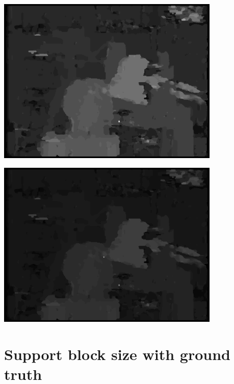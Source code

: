 \documentclass[a4paper]{scrartcl}
\begin{document}
\vspace{1cm}
\begin{minipage}{0.8\textwidth}
  \centering
  \includegraphics[width=0.8\textwidth]{images/disparity-r3-ssd-d32-m1.png}
  \label{fig:disparity-r3-ssd-d32-m1}
\end{minipage}

\vspace{1cm}
\begin{minipage}{0.8\textwidth}
  \centering
  \includegraphics[width=0.8\textwidth]{images/disparity-r3-ssd-d64-m1.png}
  \label{fig:disparity-r3-ssd-d64-m1}
\end{minipage}



\section{Support block size with ground truth}
\end{document}
